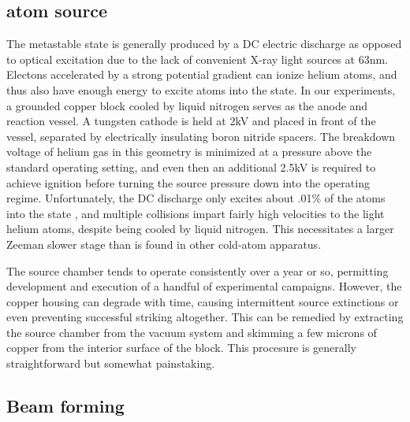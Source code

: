 \subsection*{\mhe atom source}

	The metastable \mhe state is generally produced by a DC electric discharge as opposed to optical excitation due to the lack of convenient X-ray light sources at 63nm.
	Electons accelerated by a strong potential gradient can ionize helium atoms, and thus also have enough energy to excite atoms into the \mhe state.
	In our experiments, a grounded copper block cooled by liquid nitrogen serves as the anode and reaction vessel.
	A tungsten cathode is held at 2kV and placed in front of the vessel, separated by electrically insulating boron nitride spacers.
	The breakdown voltage of helium gas in this geometry is minimized at a pressure above the standard operating setting, and even then an additional 2.5kV is required to achieve ignition before turning the source pressure down into the operating regime.
	Unfortunately, the DC discharge only excites about .01\% of the atoms into the \mhe state \cite{stas06}, and multiple collisions impart fairly high velocities to the light helium atoms, despite being cooled by liquid nitrogen.
	This necessitates a larger Zeeman slower stage than is found in other cold-atom apparatus.

	The source chamber tends to operate consistently over a year or so, permitting development and execution of a handful of experimental campaigns.
	However, the copper housing can degrade with time, causing intermittent source extinctions or even preventing successful striking altogether.
	This can be remedied by extracting the source chamber from the vacuum system and skimming a few microns of copper from the interior surface of the block.
	This procesure is generally straightforward but somewhat painstaking.
	

\subsection*{Beam forming}

